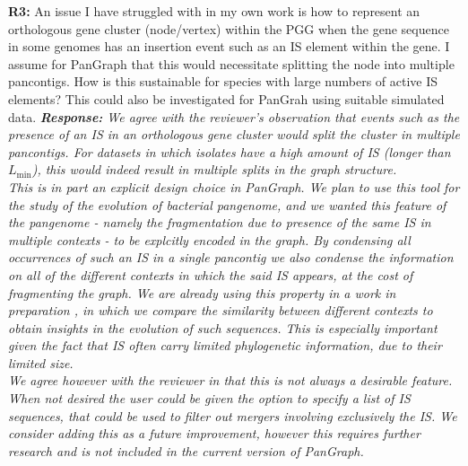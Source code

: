 \documentclass[aps,rmp,onecolumn]{revtex4-1}
\newcommand{\Lthr}{L_{\min}}
\newcommand{\Marco}[1]{{\color{orange}Marco: #1}}
\newcommand{\Liam}[1]{{\color{teal}Liam: #1}}
\newcommand{\reviewer}[2]{\textbf{#1:} #2\vskip 5mm}
\newcommand{\response}[1]{{\it {\color{response}\textbf{Response:} #1}}\vskip 5mm}
\begin{document}
\reviewer{R3}{An issue I have struggled with in my own work is how to represent an orthologous gene cluster (node/vertex) within the PGG when the gene sequence in some genomes has an insertion event such as an IS element within the gene. I assume for PanGraph that this would necessitate splitting the node into multiple pancontigs. How is this sustainable for species with large numbers of active IS elements? This could also be investigated for PanGrah using suitable simulated data.}
\response{
      We agree with the reviewer's observation that events such as the presence of an IS in an orthologous gene cluster would split the cluster in multiple pancontigs. For datasets in which isolates have a high amount of IS (longer than $\Lthr$), this would indeed result in multiple splits in the graph structure.\\
      This is in part an explicit design choice in \textit{PanGraph}. We plan to use this tool for the study of the evolution of bacterial pangenome, and we wanted this feature of the pangenome - namely the fragmentation due to presence of the same IS in multiple contexts - to be explcitly encoded in the graph. By condensing all occurrences of such an IS in a single pancontig we also condense the information on all of the different contexts in which the said IS appears, at the cost of fragmenting the graph. We are already using this property in a work in preparation \cite{shaw_preparation}, in which we compare the similarity between different contexts to obtain insights in the evolution of such sequences. This is especially important given the fact that IS often carry limited phylogenetic information, due to their limited size.\\
      We agree however with the reviewer in that this is not always a desirable feature. When not desired the user could be given the option to specify a list of IS sequences, that could be used to filter out mergers involving exclusively the IS. We consider adding this as a future improvement, however this requires further research and is not included in the current version of \textit{PanGraph}.
}


{}
\end{document}
